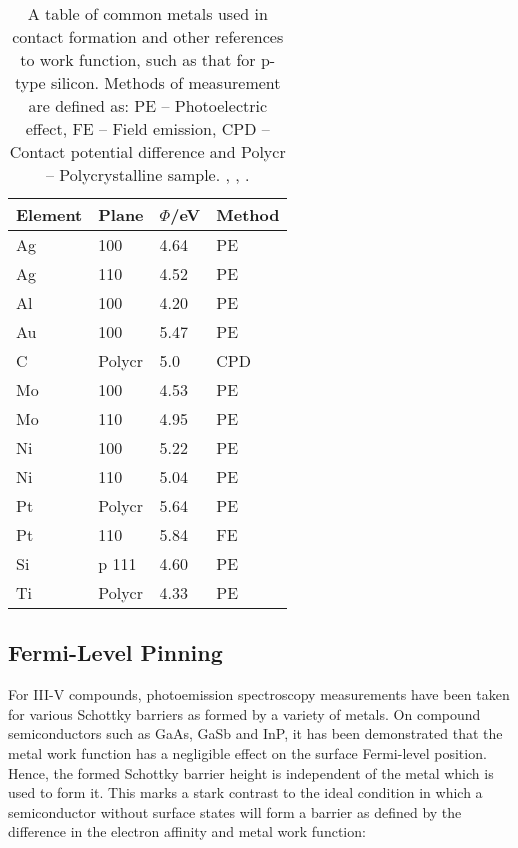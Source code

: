 \begin{table}[]
\begin{tabular}{|l|l|l|l|}
\hline
Element & Plane  & $\Phi$/eV & Method \\ \hline
Ag      & 100    & 4.64   & PE     \\ \hline
Ag      & 110    & 4.52   & PE     \\ \hline
Al      & 100    & 4.20   & PE     \\ \hline
Au      & 100    & 5.47   & PE     \\ \hline
C       & Polycr & 5.0    & CPD    \\ \hline
Mo      & 100    & 4.53   & PE     \\ \hline
Mo      & 110    & 4.95   & PE     \\ \hline
Ni      & 100    & 5.22   & PE     \\ \hline
Ni      & 110    & 5.04   & PE     \\ \hline
Pt      & Polycr & 5.64   & PE     \\ \hline
Pt      & 110    & 5.84   & FE     \\ \hline
Si      & p 111  & 4.60   & PE     \\ \hline
Ti      & Polycr & 4.33   & PE     \\ \hline
\end{tabular}
\caption{A table of common metals used in contact formation and other references to work function, such as that for p-type \hkl[111] silicon. Methods of measurement are defined as: PE -- Photoelectric effect, FE -- Field emission, CPD -- Contact potential difference and Polycr -- Polycrystalline sample. \cite{holzl1979}, \cite{green1969}, \cite{michaelson1977}.}
\label{tab:metal_work_functions_general}
\end{table}

\subsection{Fermi-Level Pinning}
For III-V compounds, photoemission spectroscopy measurements have been taken for various Schottky barriers as formed by a variety of metals. On compound semiconductors such as GaAs, GaSb and InP, it has been demonstrated that the metal work function has a negligible effect on the surface Fermi-level position. Hence, the formed Schottky barrier height is independent of the metal which is used to form it. This marks a stark contrast to the ideal condition in which a semiconductor without surface states will form a barrier as defined by the difference in the electron affinity and metal work function:

